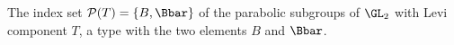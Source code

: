 The index set $\mathcal P(T)=\{B,\Bbar\}$ of the parabolic subgroups of $\GL_2$ with Levi component $T$, a type with the two elements
$B$ and $\Bbar$.
